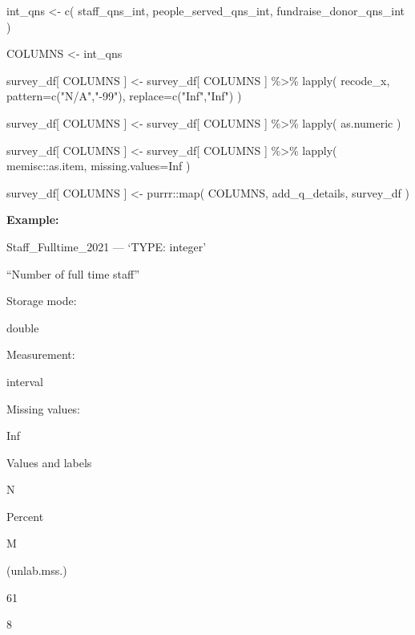 \documentclass[
  letterpaper,
]{scrbook}
\newenvironment{Shaded}{\begin{snugshade}}{\end{snugshade}}
\newcommand{\AttributeTok}[1]{\textcolor[rgb]{0.40,0.45,0.13}{#1}}
\newcommand{\ConstantTok}[1]{\textcolor[rgb]{0.56,0.35,0.01}{#1}}
\newcommand{\FunctionTok}[1]{\textcolor[rgb]{0.28,0.35,0.67}{#1}}
\newcommand{\NormalTok}[1]{\textcolor[rgb]{0.00,0.23,0.31}{#1}}
\newcommand{\OtherTok}[1]{\textcolor[rgb]{0.00,0.23,0.31}{#1}}
\newcommand{\SpecialCharTok}[1]{\textcolor[rgb]{0.37,0.37,0.37}{#1}}
\newcommand{\StringTok}[1]{\textcolor[rgb]{0.13,0.47,0.30}{#1}}
\begin{document}
\begin{Shaded}
\begin{Highlighting}[]
\NormalTok{int\_qns }\OtherTok{\textless{}{-}} 
  \FunctionTok{c}\NormalTok{( staff\_qns\_int, }
\NormalTok{     people\_served\_qns\_int, }
\NormalTok{     fundraise\_donor\_qns\_int )}

\NormalTok{COLUMNS }\OtherTok{\textless{}{-}}\NormalTok{ int\_qns}

\NormalTok{survey\_df[ COLUMNS ] }\OtherTok{\textless{}{-}} 
\NormalTok{  survey\_df[ COLUMNS ] }\SpecialCharTok{\%\textgreater{}\%}
  \FunctionTok{lapply}\NormalTok{( recode\_x, }\AttributeTok{pattern=}\FunctionTok{c}\NormalTok{(}\StringTok{"N/A"}\NormalTok{,}\StringTok{"{-}99"}\NormalTok{), }\AttributeTok{replace=}\FunctionTok{c}\NormalTok{(}\StringTok{"Inf"}\NormalTok{,}\StringTok{"Inf"}\NormalTok{) )}

\NormalTok{survey\_df[ COLUMNS ] }\OtherTok{\textless{}{-}} 
\NormalTok{  survey\_df[ COLUMNS ] }\SpecialCharTok{\%\textgreater{}\%}
  \FunctionTok{lapply}\NormalTok{( as.numeric )}

\NormalTok{survey\_df[ COLUMNS ] }\OtherTok{\textless{}{-}} 
\NormalTok{  survey\_df[ COLUMNS ] }\SpecialCharTok{\%\textgreater{}\%}
  \FunctionTok{lapply}\NormalTok{( memisc}\SpecialCharTok{::}\NormalTok{as.item, }\AttributeTok{missing.values=}\ConstantTok{Inf}\NormalTok{ )}

\NormalTok{survey\_df[ COLUMNS ] }\OtherTok{\textless{}{-}}\NormalTok{ purrr}\SpecialCharTok{::}\FunctionTok{map}\NormalTok{( COLUMNS, add\_q\_details, survey\_df )}
\end{Highlighting}
\end{Shaded}

\textbf{Example:}

Staff\_Fulltime\_2021 --- {`TYPE: integer'}

``Number of full time staff''

Storage mode:

double

Measurement:

interval

Missing values:

Inf

Values and labels

N

Percent

M

(unlab.mss.)

61

8
\end{document}
